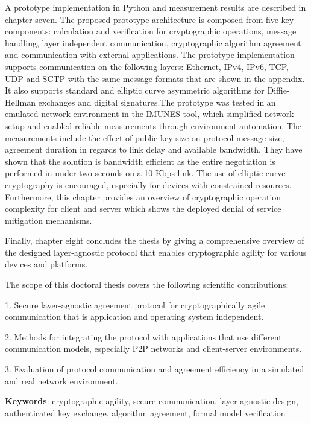 A prototype implementation in Python and measurement results are described in
chapter seven. 
The proposed prototype architecture is composed from five key components:
calculation and verification for cryptographic operations, message handling,
layer independent communication, cryptographic algorithm agreement and
communication with external applications. The prototype implementation supports
communication on the following layers: Ethernet, IPv4, IPv6, TCP, UDP and SCTP
with the same message formats that are shown in the appendix. It also supports
standard and elliptic curve asymmetric algorithms for Diffie-Hellman exchanges
and digital signatures.The prototype was tested in an emulated network
environment in the IMUNES tool, which simplified network setup and enabled
reliable measurements through environment automation. The measurements include
the effect of public key size on protocol message size, agreement duration in
regards to link delay and available bandwidth. They have shown that the solution
is bandwidth efficient as the entire negotiation is performed in under two
seconds on a 10 Kbps link. The use of elliptic curve cryptography is encouraged,
especially for devices with constrained resources. Furthermore, this chapter
provides an overview of cryptographic operation complexity for client and
server which shows the deployed denial of service mitigation mechanisms.

Finally, chapter eight concludes the thesis by giving a comprehensive overview
of the designed layer-agnostic protocol that enables cryptographic agility for
various devices and platforms. 

The scope of this doctoral thesis covers the following scientific contributions:

1. Secure layer-agnostic agreement protocol for cryptographically agile
communication that is application and operating system independent.

2. Methods for integrating the protocol with applications that use different
communication models, especially P2P networks and client-server environments.

3. Evaluation of protocol communication and agreement efficiency in a simulated
and real network environment.

\vspace{1cm}
\textbf{Keywords}: cryptographic agility, secure communication, layer-agnostic
design, authenticated key exchange, algorithm agreement, formal model
verification

